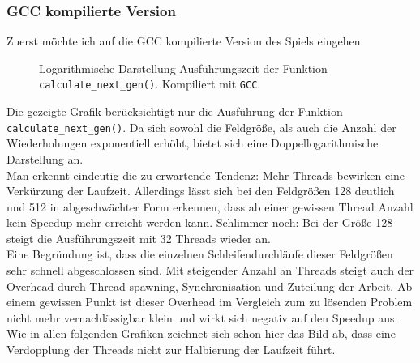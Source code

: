 \documentclass[german,plainarticle,hyperref,utf8,appendix]{zihpub}
\begin{document}
    \subsubsection{GCC kompilierte Version}
    Zuerst möchte ich auf die GCC kompilierte Version des Spiels eingehen.
    \begin{figure}[h]
    	\begin{center}
    		
    	\end{center}
    	\caption{Logarithmische Darstellung Ausführungszeit der Funktion \texttt{calculate\_next\_gen()}. Kompiliert mit \texttt{GCC}.}
    \end{figure}
	\newline
	Die gezeigte Grafik berücksichtigt nur die Ausführung der Funktion \texttt{calculate\_next\_gen()}. Da sich sowohl die Feldgröße, als auch die Anzahl der Wiederholungen exponentiell erhöht, bietet sich eine Doppellogarithmische Darstellung an.\\
	Man erkennt eindeutig die zu erwartende Tendenz: Mehr Threads bewirken eine Verkürzung der Laufzeit. Allerdings lässt sich bei den Feldgrößen 128 deutlich und 512 in abgeschwächter Form erkennen, dass ab einer gewissen Thread Anzahl kein Speedup mehr erreicht werden kann. Schlimmer noch: Bei der Größe 128 steigt die Ausführungszeit mit 32 Threads wieder an.\\
	Eine Begründung ist, dass die einzelnen Schleifendurchläufe dieser Feldgrößen sehr schnell abgeschlossen sind. Mit steigender Anzahl an Threads steigt auch der Overhead durch Thread spawning, Synchronisation und Zuteilung der Arbeit. Ab einem gewissen Punkt ist dieser Overhead im Vergleich zum zu lösenden Problem nicht mehr vernachlässigbar klein und wirkt sich negativ auf den Speedup aus.\\
	
	Wie in allen folgenden Grafiken zeichnet sich schon hier das Bild ab, dass eine Verdopplung der Threads nicht zur Halbierung der Laufzeit führt.
\appendix
\end{document}
